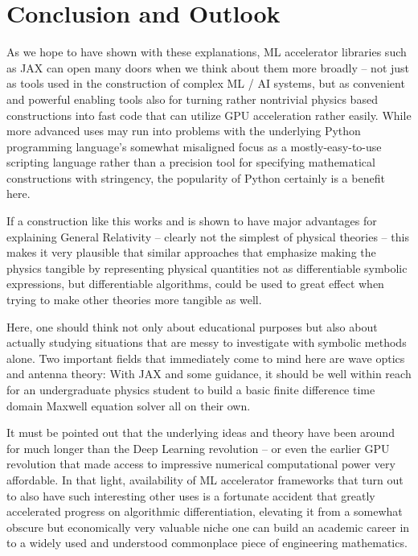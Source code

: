 \documentclass[twocolumn]{article}
\begin{document}
\section{Conclusion and Outlook}\label{sec:conclusion}

As we hope to have shown with these explanations, ML accelerator
libraries such as JAX can open many doors when we think about them
more broadly -- not just as tools used in the construction of complex
ML / AI systems, but as convenient and powerful enabling tools also
for turning rather nontrivial physics based constructions into fast
code that can utilize GPU acceleration rather easily. While more
advanced uses may run into problems with the underlying Python
programming language's somewhat misaligned focus as a
mostly-easy-to-use scripting language rather than a precision tool for
specifying mathematical constructions with stringency, the popularity
of Python certainly is a benefit here.

If a construction like this works and is shown to have major
advantages for explaining General Relativity -- clearly not the
simplest of physical theories -- this makes it very plausible that
similar approaches that emphasize making the physics tangible by
representing physical quantities not as differentiable symbolic
expressions, but differentiable algorithms, could be used to great
effect when trying to make other theories more tangible as well.

Here, one should think not only about educational purposes but also
about actually studying situations that are messy to investigate with
symbolic methods alone. Two important fields that immediately come to
mind here are wave optics and antenna theory: With JAX and some
guidance, it should be well within reach for an undergraduate physics
student to build a basic finite difference time domain Maxwell
equation solver all on their own.

It must be pointed out that the underlying ideas and theory have been
around for much longer than the Deep Learning revolution -- or even
the earlier GPU revolution that made access to impressive numerical
computational power very affordable. In that light, availability of ML
accelerator frameworks that turn out to also have such interesting
other uses is a fortunate accident that greatly accelerated progress
on algorithmic differentiation, elevating it from a somewhat obscure
but economically very valuable niche one can build an academic career
in to a widely used and understood commonplace piece of engineering
mathematics.
\end{document}
